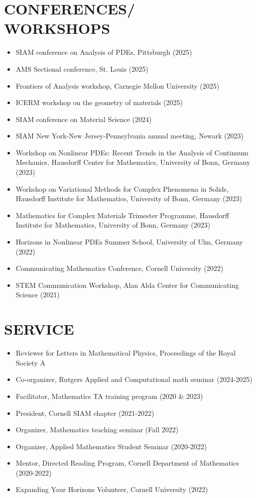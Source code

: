 \documentclass[margin]{res} %
\begin{document}
\begin{resume}
\section{CONFERENCES/\\WORKSHOPS}
\begin{itemize}
	\item SIAM conference on Analysis of PDEs, Pittsburgh (2025)
	\item AMS Sectional conference, St. Louis (2025)
	\item Frontiers of Analysis workshop, Carnegie Mellon University (2025)
	\item ICERM workshop on the geometry of materials (2025)
	\item SIAM conference on Material Science (2024)
	\item SIAM New York-New Jersey-Pennsylvania annual meeting, Newark (2023)
	\item Workshop on Nonlinear PDEs: Recent Trends in the Analysis of Continuum Mechanics, Hausdorff Center for Mathematics, University of Bonn, Germany (2023)
	\item Workshop on Variational Methods for Complex Phenomena in Solids, Hausdorff Institute for Mathematics, University of Bonn, Germany (2023)
	\item Mathematics for Complex Materials Trimester Programme, Hausdorff Institute for Mathematics, University of Bonn, Germany (2023)
	\item Horizons in Nonlinear PDEs Summer School, University of Ulm, Germany (2022)
	\item Communicating Mathematics Conference, Cornell University (2022)
	\item STEM Communication Workshop, Alan Alda Center for Communicating Science (2021)
\end{itemize}

\section{SERVICE}
\begin{itemize}
	\item Reviewer for Letters in Mathematical Physics, Proceedings of the Royal Society A
	\item Co-organizer, Rutgers Applied and Computational math seminar (2024-2025)
	\item Facilitator, Mathematics TA training program (2020 \& 2023)
	\item President, Cornell SIAM chapter (2021-2022)
	\item Organizer, Mathematics teaching seminar (Fall 2022)
	\item Organizer, Applied Mathematics Student Seminar (2020-2022)
	\item Mentor, Directed Reading Program, Cornell Department of Mathematics (2020-2022)
	\item Expanding Your Horizons Volunteer, Cornell University (2022)
\end{itemize}


\end{resume}
\end{document}
